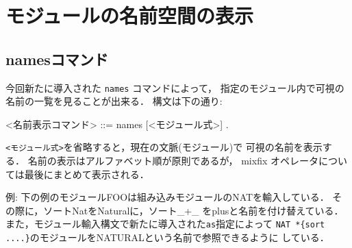 \documentclass[a4paper,oneside,10pt]{memoir}
\newenvironment{vvtm}%
{\parskip=0pt\lineskip=0pt\begin{center}\begin{minipage}{0.8\textwidth}\begin{snugshade}}%
  {\end{snugshade}\end{minipage}\end{center}}
\begin{document}
\section{モジュールの名前空間の表示}
\subsection{namesコマンド}
\label{sec:names-command}
今回新たに導入された \texttt{names} コマンドによって，
指定のモジュール内で可視の名前の一覧を見ることが出来る．
構文は下の通り:
\begin{vvtm}
\begin{simplev}
<名前表示コマンド>  ::= names [<モジュール式>] .
\end{simplev}
\end{vvtm}

\texttt{<モジュール式>}を省略すると，現在の文脈(モジュール)で%
可視の名前を表示する．
名前の表示はアルファベット順が原則であるが，
mixfix オペレータについては最後にまとめて表示される．

例: 下の例のモジュールFOOは組み込みモジュールのNATを輸入している．
その際に，ソートNatをNaturalに，ソート\_+\_ をplusと名前を付け替えている．
また，モジュール輸入構文で新たに導入された\texttt{as}指定によって%
\texttt{NAT *\{sort ....\}}のモジュールをNATURALという名前で参照できるように%
している．
\end{document}
